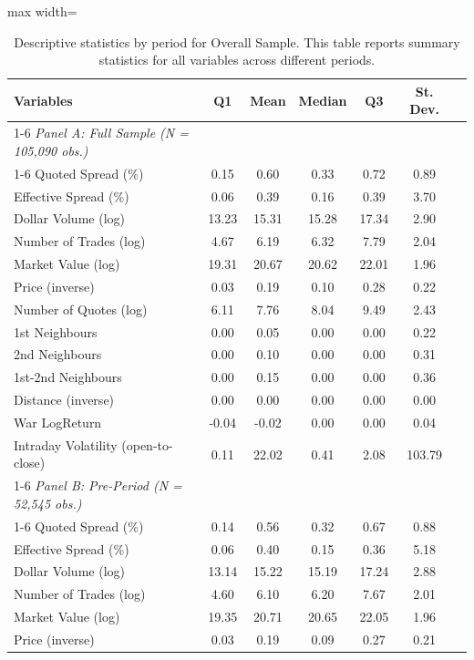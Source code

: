 \begin{table}[!htp]
\centering
\caption{Descriptive statistics by period for Overall Sample. This table reports summary statistics for all variables across different periods.}
\label{tab:descriptives}
\begin{adjustbox}{max width=\textwidth}
\scriptsize
\begin{tabular}{lcccccc}
\toprule
Variables  & Q1 & Mean & Median & Q3 & St. Dev.  \\
\cmidrule{1-6}
\textit{Panel A: Full Sample (N = 105,090 obs.)} \\
\cmidrule{1-6}
Quoted Spread (\%) & 0.15 & 0.60 & 0.33 & 0.72 & 0.89 &  \\
Effective Spread (\%) & 0.06 & 0.39 & 0.16 & 0.39 & 3.70 &  \\
Dollar Volume (log) & 13.23 & 15.31 & 15.28 & 17.34 & 2.90 &  \\
Number of Trades (log) & 4.67 & 6.19 & 6.32 & 7.79 & 2.04 &  \\
Market Value (log) & 19.31 & 20.67 & 20.62 & 22.01 & 1.96 &  \\
Price (inverse) & 0.03 & 0.19 & 0.10 & 0.28 & 0.22 &  \\
Number of Quotes (log) & 6.11 & 7.76 & 8.04 & 9.49 & 2.43 &  \\
1st Neighbours & 0.00 & 0.05 & 0.00 & 0.00 & 0.22 &  \\
2nd Neighbours & 0.00 & 0.10 & 0.00 & 0.00 & 0.31 &  \\
1st-2nd Neighbours & 0.00 & 0.15 & 0.00 & 0.00 & 0.36 &  \\
Distance (inverse) & 0.00 & 0.00 & 0.00 & 0.00 & 0.00 &  \\
War LogReturn & -0.04 & -0.02 & 0.00 & 0.00 & 0.04 &  \\
Intraday Volatility (open-to-close) & 0.11 & 22.02 & 0.41 & 2.08 & 103.79 &  \\
\cmidrule{1-6}
\textit{Panel B: Pre-Period (N = 52,545 obs.)} \\
\cmidrule{1-6}
Quoted Spread (\%) & 0.14 & 0.56 & 0.32 & 0.67 & 0.88 &  \\
Effective Spread (\%) & 0.06 & 0.40 & 0.15 & 0.36 & 5.18 &  \\
Dollar Volume (log) & 13.14 & 15.22 & 15.19 & 17.24 & 2.88 &  \\
Number of Trades (log) & 4.60 & 6.10 & 6.20 & 7.67 & 2.01 &  \\
Market Value (log) & 19.35 & 20.71 & 20.65 & 22.05 & 1.96 &  \\
Price (inverse) & 0.03 & 0.19 & 0.09 & 0.27 & 0.21 &  \\

\end{tabular}
\end{adjustbox}
\end{table}
